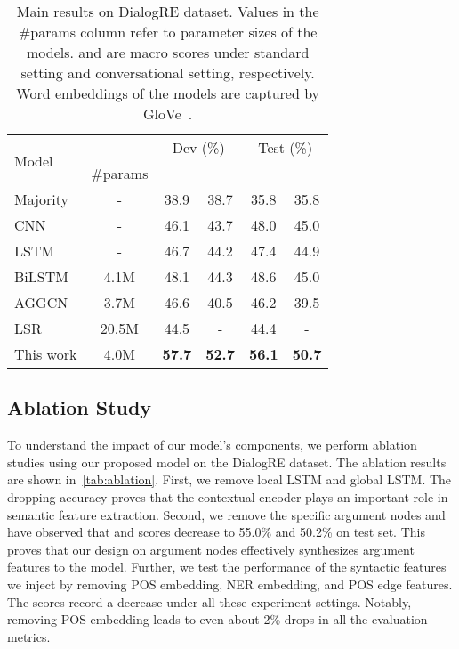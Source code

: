 \documentclass[11pt]{article}
\begin{document}
\begin{table*}[ht]
\centering
\begin{tabular}{l|c|cccc}
\toprule
\multirow{2}{*}{Model} & &
\multicolumn{2}{c}{Dev (\%)} &
\multicolumn{2}{c}{Test (\%)} \\
& \#params &  &  &  &  \\
\midrule
Majority~\cite{yu2020dialogue} & - & 38.9 & 38.7 & 35.8 & 35.8 \\
CNN~\cite{yu2020dialogue} & - & 46.1 & 43.7 & 48.0 & 45.0 \\
LSTM~\cite{yu2020dialogue} & - & 46.7 & 44.2 & 47.4 & 44.9 \\
BiLSTM~\cite{yu2020dialogue} & 4.1M & 48.1 & 44.3 & 48.6 & 45.0 \\
\midrule
AGGCN~\cite{guo2019attention} & 3.7M & 46.6 & 40.5 & 46.2 & 39.5 \\
LSR~\cite{nan2020reasoning} & 20.5M & 44.5 & - & 44.4 & - \\
\midrule
This work & 4.0M & \textbf{57.7} & \textbf{52.7} & \textbf{56.1} & \textbf{50.7} \\
\bottomrule
\end{tabular}
\caption{Main results on DialogRE dataset. Values in the \#params column refer to parameter sizes of the models.  and  are macro  scores under standard setting and conversational setting, respectively. Word embeddings of the models are captured by GloVe~\cite{pennington2014glove}.}
\label{tab:results}
\end{table*}

\subsection{Ablation Study}
To understand the impact of our model's components, we perform ablation studies using our proposed model on the DialogRE dataset. The ablation results are shown in~\cref{tab:ablation}. First, we remove local LSTM and global LSTM.
The dropping accuracy
proves that the contextual encoder plays an important role in semantic feature extraction. Second, we remove the specific argument nodes and have observed that  and  scores decrease to 55.0\% and 50.2\% on test set. This proves that our design on argument nodes effectively synthesizes argument features to the model.
Further, we test the performance of the syntactic features we inject by removing POS embedding, NER embedding, and POS edge features.
The scores record a decrease under all these experiment settings. Notably, removing POS embedding leads to even about 2\% drops in all the evaluation metrics.
\end{document}
